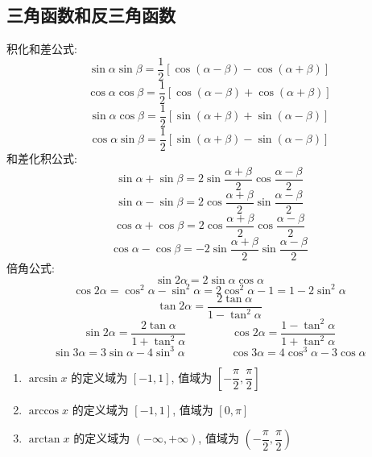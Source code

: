 \subsection{三角函数和反三角函数}
\begin{theorem}
	积化和差公式:
	$$\sin\alpha\sin\beta=\dfrac{1}{2}[\cos(\alpha-\beta)-\cos(\alpha+\beta)]$$
	$$\cos\alpha\cos\beta=\dfrac{1}{2}[\cos(\alpha-\beta)+\cos(\alpha+\beta)]$$
	$$\sin\alpha\cos\beta=\dfrac{1}{2}[\sin(\alpha+\beta)+\sin(\alpha-\beta)]$$
	$$\cos\alpha\sin\beta=\dfrac{1}{2}[\sin(\alpha+\beta)-\sin(\alpha-\beta)]$$
	和差化积公式:
	$$\sin\alpha+\sin\beta=2\sin\dfrac{\alpha+\beta}{2}\cos\dfrac{\alpha-\beta}{2}$$
	$$\sin\alpha-\sin\beta=2\cos\dfrac{\alpha+\beta}{2}\sin\dfrac{\alpha-\beta}{2}$$
	$$\cos\alpha+\cos\beta=2\cos\dfrac{\alpha+\beta}{2}\cos\dfrac{\alpha-\beta}{2}$$
	$$\cos\alpha-\cos\beta=-2\sin\dfrac{\alpha+\beta}{2}\sin\dfrac{\alpha-\beta}{2}$$
	倍角公式:
	$$\sin 2\alpha = 2\sin\alpha\cos\alpha$$
	$$\cos 2\alpha = \cos^{2}\alpha-\sin^{2}\alpha = 2\cos^{2}\alpha-1 = 1-2\sin^{2}\alpha$$
	$$\tan 2\alpha = \dfrac{2\tan\alpha}{1-\tan^{2}\alpha}$$
	$$\sin 2\alpha = \dfrac{2\tan \alpha}{1+\tan^{2}\alpha}\qquad \qquad \cos 2\alpha = \dfrac{1-\tan^{2}\alpha}{1+\tan^{2}\alpha}$$
	$$\sin 3\alpha = 3\sin \alpha -4\sin^{3}\alpha\qquad\qquad \cos 3\alpha = 4\cos^{3}\alpha -3\cos \alpha$$
\end{theorem}
\begin{definition}[反三角函数]
	\begin{enumerate}
		\item $\arcsin x$ 的定义域为 $[-1,1]$, 值域为 $[-\dfrac{\pi}{2},\dfrac{\pi}{2}]$
		\item $\arccos x$ 的定义域为 $[-1,1]$, 值域为 $[0,\pi]$
		\item $\arctan x$ 的定义域为 $(-\infty,+\infty)$, 值域为 $(-\dfrac{\pi}{2},\dfrac{\pi}{2})$
	\end{enumerate}
\end{definition}
